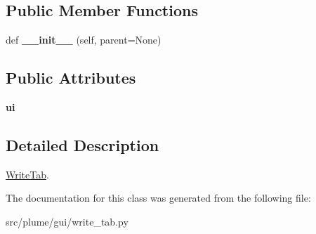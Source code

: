 \subsection*{Public Member Functions}
\begin{DoxyCompactItemize}
\item 
def {\bfseries \+\_\+\+\_\+init\+\_\+\+\_\+} (self, parent=None)\hypertarget{classplume-creator_1_1src_1_1plume_1_1gui_1_1write__tab_1_1_write_tab_adf5934989b330e88c80429f3131725a6}{}\label{classplume-creator_1_1src_1_1plume_1_1gui_1_1write__tab_1_1_write_tab_adf5934989b330e88c80429f3131725a6}

\end{DoxyCompactItemize}
\subsection*{Public Attributes}
\begin{DoxyCompactItemize}
\item 
{\bfseries ui}\hypertarget{classplume-creator_1_1src_1_1plume_1_1gui_1_1write__tab_1_1_write_tab_acebfea9ac614d8ba5d0e85b03566f0bc}{}\label{classplume-creator_1_1src_1_1plume_1_1gui_1_1write__tab_1_1_write_tab_acebfea9ac614d8ba5d0e85b03566f0bc}

\end{DoxyCompactItemize}


\subsection{Detailed Description}
\hyperlink{classplume-creator_1_1src_1_1plume_1_1gui_1_1write__tab_1_1_write_tab}{Write\+Tab}. 

The documentation for this class was generated from the following file\+:\begin{DoxyCompactItemize}
\item 
src/plume/gui/write\+\_\+tab.\+py\end{DoxyCompactItemize}
